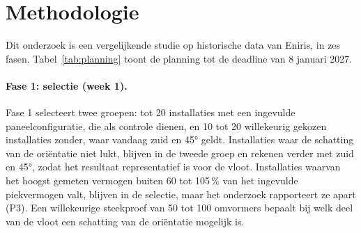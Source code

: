\section{Methodologie}%
\label{sec:methodologie}

Dit onderzoek is een vergelijkende studie op historische data van Eniris, in zes fasen. Tabel~\ref{tab:planning} toont de planning tot de deadline van 8 januari 2027.

\paragraph{Fase 1: selectie (week 1).}
Fase 1 selecteert twee groepen: tot 20 installaties met een ingevulde paneelconfiguratie, die als controle dienen, en 10 tot 20 willekeurig gekozen installaties zonder, waar vandaag zuid en 45° geldt. Installaties waar de schatting van de oriëntatie niet lukt, blijven in de tweede groep en rekenen verder met zuid en 45°, zodat het resultaat representatief is voor de vloot. Installaties waarvan het hoogst gemeten vermogen buiten 60 tot 105\,\% van het ingevulde piekvermogen valt, blijven in de selectie, maar het onderzoek rapporteert ze apart (P3). Een willekeurige steekproef van 50 tot 100 omvormers bepaalt bij welk deel van de vloot een schatting van de oriëntatie mogelijk is.

